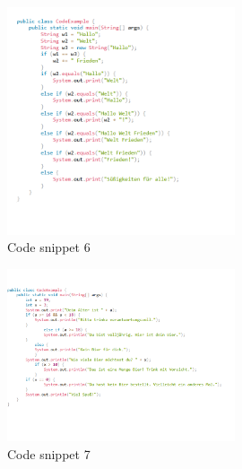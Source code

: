 \begin{figure}[H]
    \centering
    \includegraphics[width=0.6\textwidth]{figures/hello.png}
    \caption{Code snippet 6}
    \label{fig:appendix-example6}
\end{figure}


\begin{figure}[H]
    \centering
    \includegraphics[width=0.6\textwidth]{figures/bier.png}
    \caption{Code snippet 7}
    \label{fig:appendix-example7}
\end{figure}

\thispagestyle{plain}